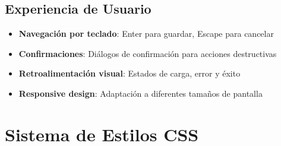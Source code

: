 \documentclass[12pt,a4paper]{article}
\begin{document}
\subsection{Experiencia de Usuario}
\begin{itemize}
  \item \textbf{Navegación por teclado}: Enter para guardar, Escape para cancelar
  \item \textbf{Confirmaciones}: Diálogos de confirmación para acciones destructivas
  \item \textbf{Retroalimentación visual}: Estados de carga, error y éxito
  \item \textbf{Responsive design}: Adaptación a diferentes tamaños de pantalla
\end{itemize}

\section{Sistema de Estilos CSS}
\end{document}

